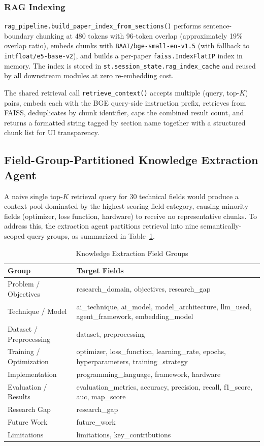 \documentclass[conference]{IEEEtran}
\begin{document}
\subsubsection{RAG Indexing}
\texttt{rag\_pipeline.build\_paper\_index\_from\_sections()} performs
sentence-boundary chunking at 480 tokens with 96-token overlap
(approximately 19\% overlap ratio), embeds chunks with
\texttt{BAAI/bge-small-en-v1.5} (with fallback to
\texttt{intfloat/e5-base-v2}), and builds a per-paper
\texttt{faiss.IndexFlatIP} index in memory. The index is stored in
\texttt{st.session\_state.rag\_index\_cache} and reused by all downstream
modules at zero re-embedding cost.

The shared retrieval call \texttt{retrieve\_context()} accepts multiple
(query, top-$K$) pairs, embeds each with the BGE query-side instruction
prefix, retrieves from FAISS, deduplicates by chunk identifier, caps the
combined result count, and returns a formatted string tagged by section name
together with a structured chunk list for UI transparency.

\subsection{Field-Group-Partitioned Knowledge Extraction Agent}

A naive single top-$K$ retrieval query for 30 technical fields would produce
a context pool dominated by the highest-scoring field category, causing
minority fields (optimizer, loss function, hardware) to receive no
representative chunks. To address this, the extraction agent partitions
retrieval into nine semantically-scoped query groups, as summarized in
Table~\ref{tab:groups}.

\begin{table}[htbp]
\caption{Knowledge Extraction Field Groups}
\label{tab:groups}
\begin{center}
\begin{tabular}{|p{2.2cm}|p{5.3cm}|}
\hline
\textbf{Group} & \textbf{Target Fields} \\
\hline
Problem / Objectives & research\_domain, objectives, research\_gap \\
\hline
Technique / Model & ai\_technique, ai\_model, model\_architecture,
  llm\_used, agent\_framework, embedding\_model \\
\hline
Dataset / Preprocessing & dataset, preprocessing \\
\hline
Training / Optimization & optimizer, loss\_function, learning\_rate,
  epochs, hyperparameters, training\_strategy \\
\hline
Implementation & programming\_language, framework, hardware \\
\hline
Evaluation / Results & evaluation\_metrics, accuracy, precision,
  recall, f1\_score, auc, map\_score \\
\hline
Research Gap & research\_gap \\
\hline
Future Work & future\_work \\
\hline
Limitations & limitations, key\_contributions \\
\hline
\end{tabular}
\end{center}
\end{table}
\end{document}
